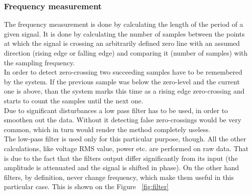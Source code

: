 \subsubsection{Frequency measurement}
The frequency measurement is done by calculating the length of the period of a given signal. It is done by calculating the number of samples between the points at which the signal is crossing an arbitrarily defined zero line with an assumed direction (rising edge or falling edge) and comparing it (number of samples) with the sampling frequency.\\
In order to detect zero-crossing two succeeding samples have to be remembered by the system. If the previous sample was below the zero-level and the current one is above, than the system marks this time as a rising edge zero-crossing and starts to count the samples until the next one.\\
Due to significant disturbances a low pass filter has to be used, in order to smoothen out the data. Without it detecting false zero-crossings would be very common, which in turn would render the method completely useless.\\
The low-pass filter is used only for this particular purpose, though. All the other calculations, like voltage RMS value, power etc. are performed on raw data. That is due to the fact that the filters output differ significantly from its input (the amplitude is attenuated and the signal is shifted in phase). On the other hand filters, by definition, never change frequency, which make them useful in this particular case. This is shown on the Figure ~\ref{fig:filter}

